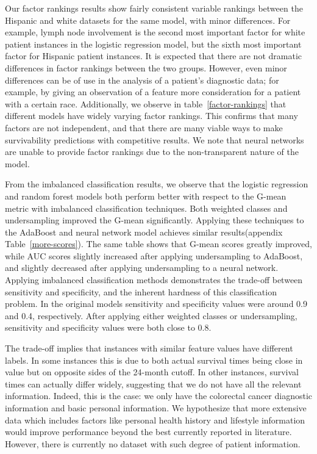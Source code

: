 \documentclass[review]{elsarticle}
\begin{document}
Our factor rankings results show fairly consistent variable rankings between the Hispanic and white datasets for the same model, with minor differences. For example, lymph node involvement is the second most important factor for white patient instances in the logistic regression model, but the sixth most important factor for Hispanic patient instances. It is expected that there are not dramatic differences in factor rankings between the two groups. However, even minor differences can be of use in the analysis of a patient’s diagnostic data; for example, by giving an observation of a feature more consideration for a patient with a certain race. Additionally, we observe in table~\ref{factor-rankings} that different models have widely varying factor rankings. This confirms that many factors are not independent, and that there are many viable ways to make survivability predictions with competitive results. We note that neural networks are unable to provide factor rankings due to the non-transparent nature of the model.

From the imbalanced classification results, we observe that the logistic regression and random forest models both perform better with respect to the G-mean metric with imbalanced classification techniques. Both weighted classes and undersampling improved the G-mean significantly. Applying these techniques to the AdaBoost and neural network model achieves similar results(appendix Table~\ref{more-scores}). The same table shows that G-mean scores greatly improved, while AUC scores slightly increased after applying undersampling to AdaBoost, and slightly decreased after applying undersampling to a neural network. Applying imbalanced classification methods demonstrates the trade-off between sensitivity and specificity, and the inherent hardness of this classification problem. In the original models sensitivity and specificity values were around 0.9 and 0.4, respectively. After applying either weighted classes or undersampling, sensitivity and specificity values were both close to 0.8. 

The trade-off implies that instances with similar feature values have different labels. In some instances this is due to both actual survival times being close in value but on opposite sides of the 24-month cutoff. In other instances, survival times can actually differ widely, suggesting that we do not have all the relevant information. Indeed, this is the case: we only have the colorectal cancer diagnostic information and basic personal information. We hypothesize that more extensive data which includes factors like personal health history and lifestyle information would improve performance beyond the best currently reported in literature. However, there is currently no dataset with such degree of patient information.
\end{document}
